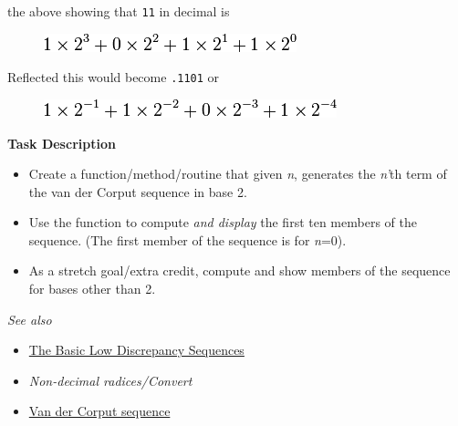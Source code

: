 the above showing that \texttt{11} in decimal is

\begin{figure}[H]
  \centering
  \includegraphics[scale=.6]{graphics/20f99c880facd5566bcaaa82f09c9282.png}
\end{figure}

Reflected this would become \texttt{.1101} or

\begin{figure}[H]
  \centering
   \includegraphics[scale=.6]{graphics/ff5080d5609a0b345d34544d1336e741.png}  
\end{figure}

\textbf{Task Description}

\begin{itemize}
\item
  Create a function/method/routine that given \emph{n}, generates the
  \emph{n'}th term of the van der Corput sequence in base 2.
\item
  Use the function to compute \emph{and display} the first ten members
  of the sequence. (The first member of the sequence is for \emph{n}=0).
\end{itemize}

\begin{itemize}
\item
  As a stretch goal/extra credit, compute and show members of the
  sequence for bases other than 2.
\end{itemize}

\emph{See also}

\begin{itemize}
\item
  \href{http://www.puc-rio.br/marco.ind/quasi\_mc.html\#low\_discrep}{The
  Basic Low Discrepancy Sequences}
\item
  \emph{Non-decimal radices/Convert}
\item
  \href{http://en.wikipedia.org/wiki/Van\_der\_Corput\_sequence}{Van der
  Corput sequence}
\end{itemize}



